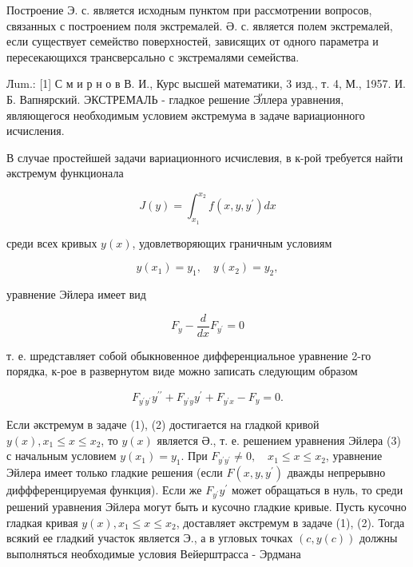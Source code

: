 \documentclass[10pt]{article}
\begin{document}
Построение Э. с. является исходным пунктом при рассмотрении вопросов, связанных с построением поля экстремалей. Ә. с. является полем экстремалей, если существует семейство поверхностей, зависящих от одного параметра и пересекающихся трансверсально с экстремалями семейства.



Лum.: [1] С м и р н о в В. И., Курс высшей математики, 3 изд., т. 4, М., 1957. И. Б. Вапнярский. ЭКСТРЕМАЛЬ - гладкое решение Эัллера уравнения, являющегося необходимым условием әкстремума в задаче вариационного исчисления.



В случае простейшей задачи вариационного исчислевия, в к-рой требуется найти әкстремум функционала



\[

J(y)=\int_{x_{1}}^{x_{2}} f\left(x, y, y^{\prime}\right) d x

\]



среди всех кривых $y(x)$, удовлетворяющих граничным условиям



\[

y\left(x_{1}\right)=y_{1}, \quad y\left(x_{2}\right)=y_{2},

\]



уравнение Эйлера имеет вид



\[

F_{y}-\frac{d}{d x} F_{y^{\prime}}=0

\]



т. е. шредставляет собой обыкновенное дифференциальное уравнение 2-го порядка, к-рое в развернутом виде можно записать следующим образом



\[

F_{y^{\prime} y^{\prime}} y^{\prime \prime}+F_{y^{\prime} y} y^{\prime}+F_{y^{\prime} x}-F_{y}=0 .

\]



Если әкстремум в задаче (1), (2) достигается на гладкой кривой $y(x), x_{1} \leqslant x \leqslant x_{2}$, то $y(x)$ является Ә., т. е. решением уравнения Эйлера (3) с начальным условием $y\left(x_{1}\right)=y_{1}$. При $F_{y^{\prime} y^{\prime}} \neq 0, \quad x_{1} \leqslant x \leqslant x_{2}$, уравнение Эйлера имеет только гладкие решения (если $F\left(x, y, y^{\prime}\right)$ дважды непрерывно диффференцируемая функция). Если же $F_{y^{\prime}} y^{\prime}$ может обращаться в нуль, то среди решений уравнения Эйлера могут быть и кусочно гладкие кривые. Пусть кусочно гладкая кривая $y(x), x_{1} \leqslant x \leqslant x_{2}$, доставляет әкстремум в задаче (1), (2). Тогда всякий ее гладкий участок является Э., а в угловых точках $(c, y(c))$ должны выполняться необходимые условия Вейерштрасса - Эрдмана
\end{document}
